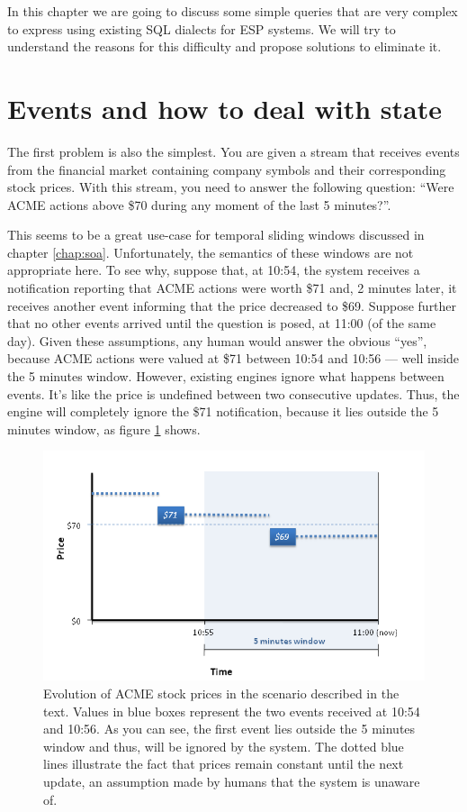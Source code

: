 \documentclass{report}
\begin{document}
In this chapter we are going to discuss some simple queries that are
very complex to express using existing SQL dialects for ESP
systems. We will try to understand the reasons for this difficulty and
propose solutions to eliminate it.

\section{Events and how to deal with state}
\label{sec:acme-problem}

The first problem is also the simplest. You are given a stream that
receives events from the financial market containing company symbols
and their corresponding stock prices. With this stream, you need to
answer the following question: ``Were ACME actions above \$70 during
any moment of the last 5 minutes?''.

This seems to be a great use-case for temporal sliding windows
discussed in chapter \ref{chap:soa}. Unfortunately, the semantics of
these windows are not appropriate here. To see why, suppose that, at
10:54, the system receives a notification reporting that ACME actions
were worth \$71 and, 2 minutes later, it receives another event
informing that the price decreased to \$69. Suppose further that no
other events arrived until the question is posed, at 11:00 (of the
same day). Given these assumptions, any human would answer the obvious
``yes'', because ACME actions were valued at \$71 between 10:54 and
10:56 --- well inside the 5 minutes window. However, existing engines
ignore what happens between events. It's like the price is undefined
between two consecutive updates. Thus, the engine will completely
ignore the \$71 notification, because it lies outside the 5 minutes
window, as figure \ref{fig:outside-window} shows.

\begin{figure}[htbp]
  \includegraphics[width=\textwidth]{outside-window.png}
  \caption{Evolution of ACME stock prices in the scenario described in
    the text. Values in blue boxes represent the two events received
    at 10:54 and 10:56. As you can see, the first event lies outside
    the 5 minutes window and thus, will be ignored by the system. The
    dotted blue lines illustrate the fact that prices remain constant
    until the next update, an assumption made by humans that the
    system is unaware of.}
  \label{fig:outside-window}
\end{figure}
\end{document}
